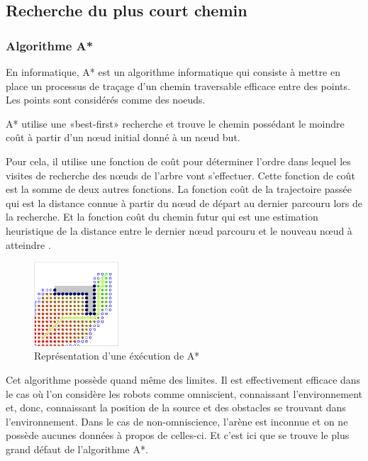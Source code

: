 \subsection{Recherche du plus court chemin}

\subsubsection{Algorithme A*}
\cite{wikiA*}

En informatique, A* est un algorithme informatique qui consiste à mettre en place un processus de traçage d'un chemin traversable efficace entre des points. Les points sont considérés comme des noeuds.

A* utilise une «best-first» recherche et trouve le chemin possédant le moindre coût à partir d'un nœud initial donné à un nœud but.

Pour cela, il utilise une fonction de coût pour déterminer l'ordre dans lequel les visites de recherche des nœuds de l'arbre vont s'effectuer. Cette fonction de coût est la somme de deux autres fonctions. La fonction coût de la trajectoire passée qui est la distance connue à partir du nœud de départ au dernier parcouru lors de la recherche. Et la fonction coût du chemin futur qui est une estimation heuristique de la distance entre le dernier nœud parcouru et le nouveau nœud à atteindre .

\begin{figure}
  \vspace{-20pt}
  \begin{center}
    \includegraphics[width=0.28\textwidth]{pics/aStar.png}
  \end{center}
  \caption{Représentation d'une éxécution de A*\cite{wikiA*}}
\end{figure}
Cet algorithme possède quand même des limites. Il est effectivement efficace dans le cas où l'on considère les robots comme omniscient, connaissant l'environnement et, donc, connaissant la position de la source et des obstacles se trouvant dans l'environnement. Dans le cas de non-omniscience, l'arène est inconnue et on ne possède aucunes données à propos de celles-ci. Et c'est ici que se trouve le plus grand défaut de l'algorithme A*.

